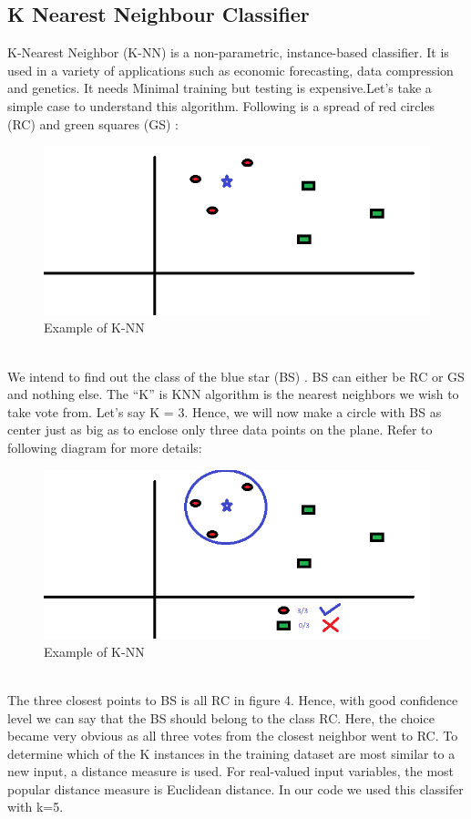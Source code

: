 \documentclass[10pt,a4paper]{article}
\begin{document}
\subsection{K Nearest Neighbour Classifier}
\textbf{}K-Nearest Neighbor (K-NN) is a non-parametric, instance-based classifier. It is used in a variety of applications such as economic forecasting, data compression and genetics. It needs Minimal training but testing is expensive.Let’s take a simple case to understand this algorithm. Following is a spread of red circles (RC) and green squares (GS) :\\
\begin{figure}[htp]
\centering
\includegraphics[scale=0.4]{scenario1.png}
\caption{Example of K-NN~\cite{d}}
\end{figure}\\
We intend to find out the class of the blue star (BS) . BS can either be RC or GS and nothing else. The “K” is KNN algorithm is the nearest neighbors we wish to take vote from. Let’s say K = 3. Hence, we will now make a circle with BS as center just as big as to enclose only three data points on the plane. Refer to following diagram for more details:\\
\begin{figure}[htp]
\centering
\includegraphics[scale=0.4]{scenario2.png}
\caption{Example of K-NN~\cite{d}}
\end{figure}\\
The three closest points to BS is all RC in figure 4. Hence, with good confidence level we can say that the BS should belong to the class RC. Here, the choice became very obvious as all three votes from the closest neighbor went to RC. To determine which of the K instances in the training dataset are most similar to a new input, a distance measure is used. For real-valued input variables, the most popular distance measure is Euclidean distance. In our code we used this classifer with k=5.
\vspace{1.8cm}
\end{document}
